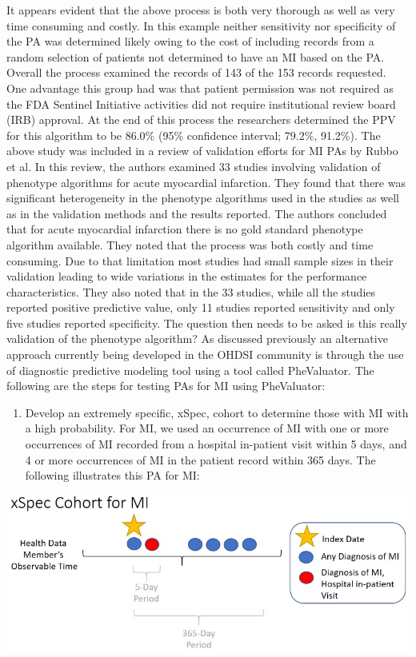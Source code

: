 \documentclass[11pt]{book}
\providecommand{\tightlist}{%
  \setlength{\itemsep}{0pt}\setlength{\parskip}{0pt}}
\theoremstyle{definition}
\theoremstyle{definition}
\theoremstyle{definition}
\theoremstyle{remark}
\begin{document}
It appears evident that the above process is both very thorough as well as very time consuming and costly. In this example neither sensitivity nor specificity of the PA was determined likely owing to the cost of including records from a random selection of patients not determined to have an MI based on the PA. Overall the process examined the records of 143 of the 153 records requested. One advantage this group had was that patient permission was not required as the FDA Sentinel Initiative activities did not require institutional review board (IRB) approval. At the end of this process the researchers determined the PPV for this algorithm to be 86.0\% (95\% confidence interval; 79.2\%, 91.2\%).
The above study was included in a review of validation efforts for MI PAs by Rubbo et al.\citep{rubbo_use_2015} In this review, the authors examined 33 studies involving validation of phenotype algorithms for acute myocardial infarction. They found that there was significant heterogeneity in the phenotype algorithms used in the studies as well as in the validation methods and the results reported. The authors concluded that for acute myocardial infarction there is no gold standard phenotype algorithm available. They noted that the process was both costly and time consuming. Due to that limitation most studies had small sample sizes in their validation leading to wide variations in the estimates for the performance characteristics. They also noted that in the 33 studies, while all the studies reported positive predictive value, only 11 studies reported sensitivity and only five studies reported specificity. The question then needs to be asked is this really validation of the phenotype algorithm?
As discussed previously an alternative approach currently being developed in the OHDSI community is through the use of diagnostic predictive modeling tool using a tool called PheValuator. The following are the steps for testing PAs for MI using PheValuator:

\begin{enumerate}
\def\labelenumi{\arabic{enumi})}
\tightlist
\item
  Develop an extremely specific, xSpec, cohort to determine those with MI with a high probability. For MI, we used an occurrence of MI with one or more occurrences of MI recorded from a hospital in-patient visit within 5 days, and 4 or more occurrences of MI in the patient record within 365 days. The following illustrates this PA for MI:
\end{enumerate}

\begin{center}\includegraphics[width=0.75\linewidth]{images/ClinicalValidity/figure5} \end{center}
\end{document}
